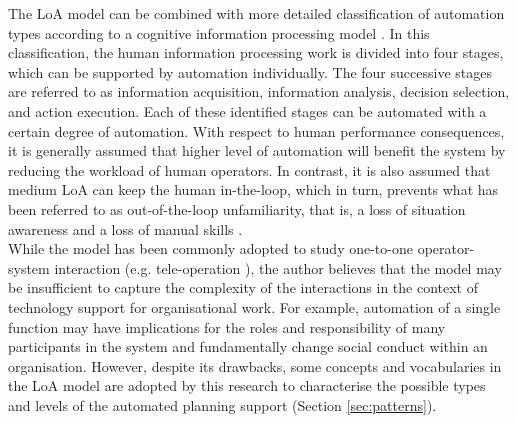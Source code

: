 The \ac{LoA} model can be combined with more detailed classification of automation types according to a cognitive information processing model \citep{Parasuraman2000,Manzey2012}. In this classification,  the human information processing work is divided into four stages, which can be supported by automation individually. The four successive stages are referred to as information acquisition, information analysis, decision selection, and action execution. Each of these identified stages can be automated with a certain degree of automation. With respect to human performance consequences, it is generally assumed that higher level of automation will benefit the system by reducing the workload of human operators. In contrast, it is also assumed that medium \ac{LoA} can keep the human in-the-loop, which in turn, prevents what has been referred to as out-of-the-loop unfamiliarity, that is, a loss of situation awareness and a loss of manual skills \citep{Kaber1997,Parasuraman2010}.\\

While the model has been commonly adopted to study one-to-one operator-system interaction (e.g. tele-operation \citep{Schwarz2014}), the author believes that the model may be insufficient to capture the complexity of the interactions in the context of technology support for organisational work. For example, automation of a single function may have implications for the roles and responsibility of many participants in the system and fundamentally change social conduct within an organisation. However, despite its drawbacks, some concepts and vocabularies in the \ac{LoA} model are adopted by this research to characterise the possible types and levels of the automated planning support (Section \ref{sec:patterns}).\\

